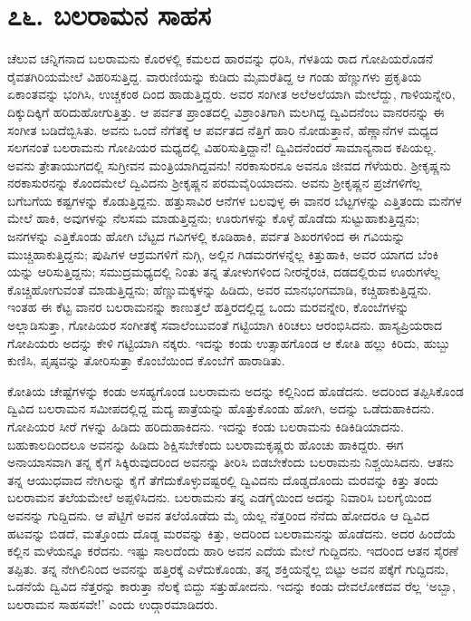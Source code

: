 
\chapter{೭೬. ಬಲರಾಮನ ಸಾಹಸ}

ಚೆಲುವ ಚನ್ನಿಗನಾದ ಬಲರಾಮನು ಕೊರಳಲ್ಲಿ ಕಮಲದ ಹಾರವನ್ನು ಧರಿಸಿ, ಗೆಳತಿಯ ರಾದ ಗೋಪಿಯರೊಡನೆ ರೈವತಗಿರಿಯಮೇಲೆ ವಿಹರಿಸುತ್ತಿದ್ದ. ವಾರುಣಿಯನ್ನು ಕುಡಿದು ಮೈಮರೆತಿದ್ದ ಆ ಗಂಡು ಹೆಣ್ಣುಗಳು ಪ್ರಕೃತಿಯ ಏಕಾಂತವನ್ನು ಭಂಗಿಸಿ, ಉಚ್ಚಕಂಠ ದಿಂದ ಹಾಡುತ್ತಿದ್ದರು. ಅವರ ಸಂಗೀತ ಅಲೆಅಲೆಯಾಗಿ ಮೇಲೆದ್ದು, ಗಾಳಿಯನ್ನೇರಿ, ದಿಕ್ಕುದಿಕ್ಕಿಗೆ ಹರಿದುಹೋಗುತ್ತಿತ್ತು. ಆ ಪರ್ವತ ಪ್ರಾಂತದಲ್ಲಿ ವಿಶ್ರಾಂತಿಗಾಗಿ ಮಲಗಿದ್ದ ದ್ವಿವಿದನೆಂಬ ವಾನರನನ್ನು ಈ ಸಂಗೀತ ಬಡಿದೆಬ್ಬಿಸಿತು. ಅವನು ಒಂದೆ ನೆಗೆತಕ್ಕೆ ಆ ಪರ್ವತದ ನೆತ್ತಿಗೆ ಹಾರಿ ನೋಡುತ್ತಾನೆ, ಹೆಣ್ಣಾನೆಗಳ ಮಧ್ಯದ ಸಲಗನಂತೆ ಬಲರಾಮನು ಗೋಪಿಯರ ಮಧ್ಯದಲ್ಲಿ ವಿಹರಿಸುತ್ತಿದ್ದಾನೆ! ದ್ವಿವಿದನೆಂದರೆ ಸಾಮಾನ್ಯನಾದ ಕಪಿಯಲ್ಲ. ಅವನು ತ್ರೇತಾಯುಗದಲ್ಲಿ ಸುಗ್ರೀವನ ಮಂತ್ರಿಯಾಗಿದ್ದವನು! ನರಕಾಸುರನೂ ಅವನೂ ಜೀವದ ಗೆಳೆಯರು. ಶ್ರೀಕೃಷ್ಣನು ನರಕಾಸುರನನ್ನು ಕೊಂದಮೇಲೆ ದ್ವಿವಿದನು ಶ್ರೀಕೃಷ್ಣನ ಪರಮವೈರಿಯಾದನು. ಅವನು ಶ್ರೀಕೃಷ್ಣನ ಪ್ರಜೆಗಳಿಗೆಲ್ಲ ಬಗೆಬಗೆಯ ಕಷ್ಟಗಳನ್ನು ಕೊಡುತ್ತಿದ್ದನು. ಹತ್ತುಸಾವಿರ ಆನೆಗಳ ಬಲವುಳ್ಳ ಈ ವಾನರ ಬೆಟ್ಟಗಳನ್ನು ಎತ್ತಿತಂದು ಮನೆಗಳ ಮೇಲೆ ಹಾಕಿ, ಅವುಗಳನ್ನು ನೆಲಸಮ ಮಾಡುತ್ತಿದ್ದನು; ಊರುಗಳನ್ನು ಕೊಳ್ಳೆ ಹೊಡೆದು ಸುಟ್ಟುಹಾಕುತ್ತಿದ್ದನು; ಜನಗಳನ್ನು ಎತ್ತಿಕೊಂಡು ಹೋಗಿ ಬೆಟ್ಟದ ಗವಿಗಳಲ್ಲಿ ಕೂಡಿಹಾಕಿ, ಪರ್ವತ ಶಿಖರಗಳಿಂದ ಈ ಗವಿಯನ್ನು ಮುಚ್ಚಿಹಾಕುತ್ತಿದ್ದನು; ಪುಷಿಗಳ ಆಶ್ರಮಗಳಿಗೆ ನುಗ್ಗಿ, ಅಲ್ಲಿನ ಗಿಡಮರಗಳನ್ನೆಲ್ಲ ಕಿತ್ತುಹಾಕಿ, ಅವರ ಯಾಗದ ಬೆಂಕಿ ಯನ್ನು ಆರಿಸುತ್ತಿದ್ದನು; ಸಮುದ್ರಮಧ್ಯದಲ್ಲಿ ನಿಂತು ತನ್ನ ತೋಳುಗಳಿಂದ ನೀರನ್ನೆರಚಿ, ದಡದಲ್ಲಿರುವ ಊರುಗಳೆಲ್ಲ ಕೊಚ್ಚಿಹೋಗುವಂತೆ ಮಾಡುತ್ತಿದ್ದನು; ಹೆಣ್ಣುಮಕ್ಕಳನ್ನು ಹಿಡಿದು, ಅವರ ಮಾನಭಂಗಮಾಡಿ, ಕಚ್ಚಿಹಾಕುತ್ತಿದ್ದನು. ಇಂತಹ ಈ ಕೆಟ್ಟ ವಾನರ ಬಲರಾಮನನ್ನು ಕಾಣುತ್ತಲೆ ಹತ್ತಿರದಲ್ಲಿದ್ದ ಒಂದು ಮರವನ್ನೇರಿ, ಕೊಂಬೆಗಳನ್ನು ಅಲ್ಲಾಡಿಸುತ್ತಾ, ಗೋಪಿಯರ ಸಂಗೀತಕ್ಕೆ ಸವಾಲೆಂಬುವಂತೆ ಗಟ್ಟಿಯಾಗಿ ಕಿರಿಚಲು ಆರಂಭಿಸಿದನು. ಹಾಸ್ಯಪ್ರಿಯರಾದ ಗೋಪಿಯರು ಅದನ್ನು ಕೇಳಿ ಗಟ್ಟಿಯಾಗಿ ನಕ್ಕರು. ಇದನ್ನು ಕಂಡು ಉತ್ಸಾಹಗೊಂಡ ಆ ಕೋತಿ ಹಲ್ಲು ಕಿರಿದು, ಹುಬ್ಬು ಕುಣಿಸಿ, ಪೃಷ್ಠವನ್ನು ತೋರಿಸುತ್ತಾ ಕೊಂಬೆಯಿಂದ ಕೊಂಬೆಗೆ ಹಾರಾಡಿತು.

ಕೋತಿಯ ಚೇಷ್ಟೆಗಳನ್ನು ಕಂಡು ಅಸಹ್ಯಗೊಂಡ ಬಲರಾಮನು ಅದನ್ನು ಕಲ್ಲಿನಿಂದ ಹೊಡೆದನು. ಅದರಿಂದ ತಪ್ಪಿಸಿಕೊಂಡ ದ್ವಿವಿದ ಬಲರಾಮನ ಸಮೀಪದಲ್ಲಿದ್ದ ಮದ್ಯ ಪಾತ್ರೆಯನ್ನು ಹೊತ್ತುಕೊಂಡು ಹೋಗಿ, ಅದನ್ನು ಒಡೆದುಹಾಕಿದನು. ಗೋಪಿಯರ ಸೀರೆ ಗಳನ್ನು ಹಿಡಿದು ಹರಿದುಹಾಕಿದನು. ಇದನ್ನು ಕಂಡು ಬಲರಾಮನು ಕಿಡಿಕಿಡಿಯಾದನು. ಬಹುಕಾಲದಿಂದಲೂ ಅವನನ್ನು ಹಿಡಿದು ಶಿಕ್ಷಿಸಬೇಕೆಂದು ಬಲರಾಮಕೃಷ್ಣರು ಹೊಂಚು ಹಾಕಿದ್ದರು. ಈಗ ಅನಾಯಾಸವಾಗಿ ತನ್ನ ಕೈಗೆ ಸಿಕ್ಕಿರುವುದರಿಂದ ಅವನನ್ನು ತೀರಿಸಿ ಬಿಡಬೇಕೆಂದು ಬಲರಾಮನು ನಿಶ್ಚಯಿಸಿದನು. ಆತನು ತನ್ನ ಆಯುಧವಾದ ನೇಗಿಲನ್ನು ಕೈಗೆ ತೆಗೆದುಕೊಳ್ಳುವಷ್ಟರಲ್ಲಿ ದ್ವಿವಿದನು ದೊಡ್ಡದೊಂದು ಮರವನ್ನು ಕಿತ್ತು ತಂದು ಬಲರಾಮನ ತಲೆಯಮೇಲೆ ಅಪ್ಪಳಿಸಿದನು. ಬಲರಾಮನು ತನ್ನ ಎಡಗೈಯಿಂದ ಅದನ್ನು ನಿವಾರಿಸಿ ಬಲಗೈಯಿಂದ ಅವನನ್ನು ಗುದ್ದಿದನು. ಆ ಪೆಟ್ಟಿಗೆ ಅವನ ತಲೆಯೊಡೆದು ಮೈ ಯೆಲ್ಲ ನೆತ್ತರಿಂದ ನೆನೆದು ಹೋದರೂ ಆ ದ್ವಿವಿದ ಹಟವನ್ನು ಬಿಡದೆ, ಮತ್ತೊಂದು ದೊಡ್ಡ ಮರವನ್ನು ಕಿತ್ತು, ಅದರಿಂದ ಬಲರಾಮನನ್ನು ಹೊಡೆದನು. ಅದರ ಹಿಂದೆಯೆ ಕಲ್ಲಿನ ಮಳೆಯನ್ನೂ ಕರೆದನು. ಇಷ್ಟು ಸಾಲದೆಂದು ಹಾರಿ ಅವನ ಎದೆಯ ಮೇಲೆ ಗುದ್ದಿದನು. ಇದರಿಂದ ಆತನ ಸೈರಣೆ ತಪ್ಪಿತು. ತನ್ನ ನೇಗಿಲಿನಿಂದ ಅವನನ್ನು ಹತ್ತಿರಕ್ಕೆ ಎಳೆದುಕೊಂಡು, ತನ್ನ ಶಕ್ತಿಯನ್ನೆಲ್ಲ ಬಿಟ್ಟು ಅವನ ಪಕ್ಕೆಗೆ ಗುದ್ದಿದನು, ಒಡನೆಯೆ ದ್ವಿವಿದ ನೆತ್ತರನ್ನು ಕಾರುತ್ತಾ ನೆಲಕ್ಕೆ ಬಿದ್ದು ಸತ್ತುಹೋದನು. ಇದನ್ನು ಕಂಡು ದೇವಲೋಕದವ ರೆಲ್ಲ ‘ಅಬ್ಬಾ, ಬಲರಾಮನ ಸಾಹಸವೇ!’ ಎಂದು ಉದ್ಗಾರಮಾಡಿದರು.

